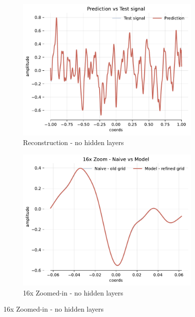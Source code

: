 \begin{figure}[!h]
    \centering
    \begin{subfigure}[b]{0.32\textwidth}
        \centering
        \includegraphics[width=\textwidth]{img/ch3/pred-2048hf-0hl-64w-sub3.pdf}
        \caption{Reconstruction - no hidden layers}
    \end{subfigure}
    \begin{subfigure}[b]{0.32\textwidth}
        \centering
        \includegraphics[width=\textwidth]{img/ch3/16x-2048hf-0hl-64w-sub3.pdf}
        \caption{16x Zoomed-in - no hidden layers}
    \end{subfigure}

\end{figure}
